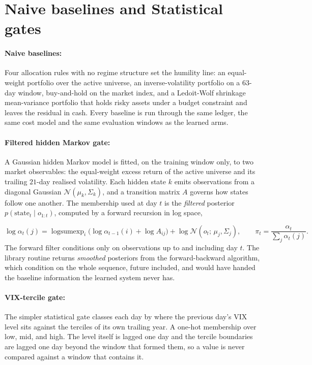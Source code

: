 \section{Naive baselines and Statistical gates}
\label{sec:baselines}

\paragraph{Naive baselines:}
Four allocation rules with no regime structure set the humility line: an equal-weight portfolio over the active universe, an inverse-volatility portfolio on a $63$-day window, buy-and-hold on the market index, and a Ledoit-Wolf shrinkage mean-variance portfolio \cite{ledoit2004honey} that holds risky assets under a budget constraint and leaves the residual in cash. Every baseline is run through the same ledger, the same cost model and the same evaluation windows as the learned arms.

\paragraph{Filtered hidden Markov gate:}
A Gaussian hidden Markov model \cite{hamilton1989new,rabiner1989tutorial} is fitted, on the training window only, to two market observables: the equal-weight excess return of the active universe and its trailing $21$-day realised volatility. Each hidden state $k$ emits observations from a diagonal Gaussian $\mathcal{N}(\mu_k,\Sigma_k)$, and a transition matrix $A$ governs how states follow one another. The membership used at day $t$ is the \emph{filtered} posterior $p(\text{state}_t \mid o_{1:t})$, computed by a forward recursion in log space,

\begin{equation}
  \log \alpha_t(j) = \operatorname{logsumexp}_i\big(\log \alpha_{t-1}(i) + \log A_{ij}\big)
      + \log \mathcal{N}(o_t;\,\mu_j,\Sigma_j),
  \qquad \pi_t = \frac{\alpha_t}{\textstyle\sum_j \alpha_t(j)}.
  \label{eq:forward}
\end{equation}
The forward filter conditions only on observations up to and including day $t$. The library routine returns \emph{smoothed} posteriors from the forward-backward algorithm, which condition on the whole sequence, future included, and would have handed the baseline information the learned system never has.

\paragraph{VIX-tercile gate:}
The simpler statistical gate classes each day by where the previous day's VIX level sits against the terciles of its own trailing year. A one-hot membership over low, mid, and high. The level itself is lagged one day and the tercile boundaries are lagged one day beyond the window that formed them, so a value is never compared against a window that contains it.


